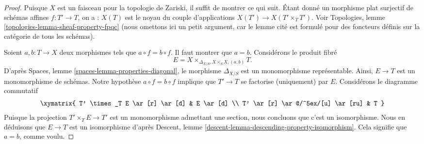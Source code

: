 \begin{proof}
Puisque $X$ est un faisceau pour la topologie de Zariski, il suffit de montrer
ce qui suit. Étant donné un morphisme plat surjectif de schémas affines
$f : T' \to T$, on a :
$X(T)$ est le noyau du couple d'applications $X(T') \to X(T' \times_T T')$.
Voir Topologies, lemme \ref{topologies-lemma-sheaf-property-fpqc}
(nous omettons ici un petit argument, car le lemme cité
est formulé pour des foncteurs définis sur la catégorie de tous les schémas).

\medskip\noindent
Soient $a, b : T \to X$ deux morphismes tels que $a \circ f = b \circ f$.
Il faut montrer que $a = b$. Considérons le produit fibré
$$
E = X \times_{\Delta_{X/S}, X \times_S X, (a, b)} T.
$$
D'après Spaces, lemme \ref{spaces-lemma-properties-diagonal},
le morphisme $\Delta_{X/S}$ est un monomorphisme représentable. Ainsi,
$E \to T$ est un monomorphisme de schémas. Notre hypothèse
$a \circ f = b \circ f$ implique que $T' \to T$ se factorise (uniquement) par $E$.
Considérons le diagramme commutatif
$$
\xymatrix{
T' \times_T E \ar[r] \ar[d] & E \ar[d] \\
T' \ar[r] \ar@/^5ex/[u] \ar[ru] & T
}
$$
Puisque la projection $T' \times_T E \to T'$ est un monomorphisme
admettant une section, nous concluons que c'est un isomorphisme. Nous en déduisons que
$E \to T$ est un isomorphisme d'après
Descent, lemme \ref{descent-lemma-descending-property-isomorphism}.
Cela signifie que $a = b$, comme voulu.


\end{proof}
